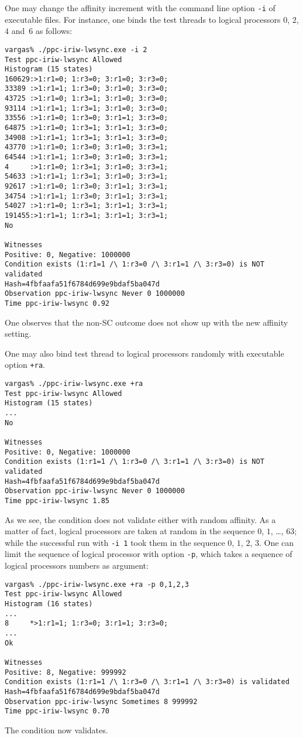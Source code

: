 One may change the affinity increment with the command line option
\texttt{-i} of executable files. For instance, one binds the test threads
to logical processors $0$, $2$, $4$ and~$6$ as follows:
\begin{verbatim}
vargas% ./ppc-iriw-lwsync.exe -i 2 
Test ppc-iriw-lwsync Allowed
Histogram (15 states)
160629:>1:r1=0; 1:r3=0; 3:r1=0; 3:r3=0;
33389 :>1:r1=1; 1:r3=0; 3:r1=0; 3:r3=0;
43725 :>1:r1=0; 1:r3=1; 3:r1=0; 3:r3=0;
93114 :>1:r1=1; 1:r3=1; 3:r1=0; 3:r3=0;
33556 :>1:r1=0; 1:r3=0; 3:r1=1; 3:r3=0;
64875 :>1:r1=0; 1:r3=1; 3:r1=1; 3:r3=0;
34908 :>1:r1=1; 1:r3=1; 3:r1=1; 3:r3=0;
43770 :>1:r1=0; 1:r3=0; 3:r1=0; 3:r3=1;
64544 :>1:r1=1; 1:r3=0; 3:r1=0; 3:r3=1;
4     :>1:r1=0; 1:r3=1; 3:r1=0; 3:r3=1;
54633 :>1:r1=1; 1:r3=1; 3:r1=0; 3:r3=1;
92617 :>1:r1=0; 1:r3=0; 3:r1=1; 3:r3=1;
34754 :>1:r1=1; 1:r3=0; 3:r1=1; 3:r3=1;
54027 :>1:r1=0; 1:r3=1; 3:r1=1; 3:r3=1;
191455:>1:r1=1; 1:r3=1; 3:r1=1; 3:r3=1;
No

Witnesses
Positive: 0, Negative: 1000000
Condition exists (1:r1=1 /\ 1:r3=0 /\ 3:r1=1 /\ 3:r3=0) is NOT validated
Hash=4fbfaafa51f6784d699e9bdaf5ba047d
Observation ppc-iriw-lwsync Never 0 1000000
Time ppc-iriw-lwsync 0.92
\end{verbatim}
One observes that the non-SC outcome does not show up
with the new affinity setting.

One may also bind test thread to logical processors randomly with
executable option \texttt{+ra}.
\begin{verbatim}
vargas% ./ppc-iriw-lwsync.exe +ra
Test ppc-iriw-lwsync Allowed
Histogram (15 states)
...
No

Witnesses
Positive: 0, Negative: 1000000
Condition exists (1:r1=1 /\ 1:r3=0 /\ 3:r1=1 /\ 3:r3=0) is NOT validated
Hash=4fbfaafa51f6784d699e9bdaf5ba047d
Observation ppc-iriw-lwsync Never 0 1000000
Time ppc-iriw-lwsync 1.85
\end{verbatim}

As we see, the condition does not validate either with random affinity.
As a matter of fact, logical processors are taken at random in the
sequence $0$, $1$, \ldots, $63$;
while the successful run with \texttt{-i 1} took
them in the sequence $0$, $1$, $2$, $3$.
One can limit the sequence of  logical processor with option \texttt{-p},
which takes a sequence of logical processors numbers as argument:
\begin{verbatim}
vargas% ./ppc-iriw-lwsync.exe +ra -p 0,1,2,3
Test ppc-iriw-lwsync Allowed
Histogram (16 states)
...
8     *>1:r1=1; 1:r3=0; 3:r1=1; 3:r3=0;
...
Ok

Witnesses
Positive: 8, Negative: 999992
Condition exists (1:r1=1 /\ 1:r3=0 /\ 3:r1=1 /\ 3:r3=0) is validated
Hash=4fbfaafa51f6784d699e9bdaf5ba047d
Observation ppc-iriw-lwsync Sometimes 8 999992
Time ppc-iriw-lwsync 0.70
\end{verbatim}
The condition now validates.

